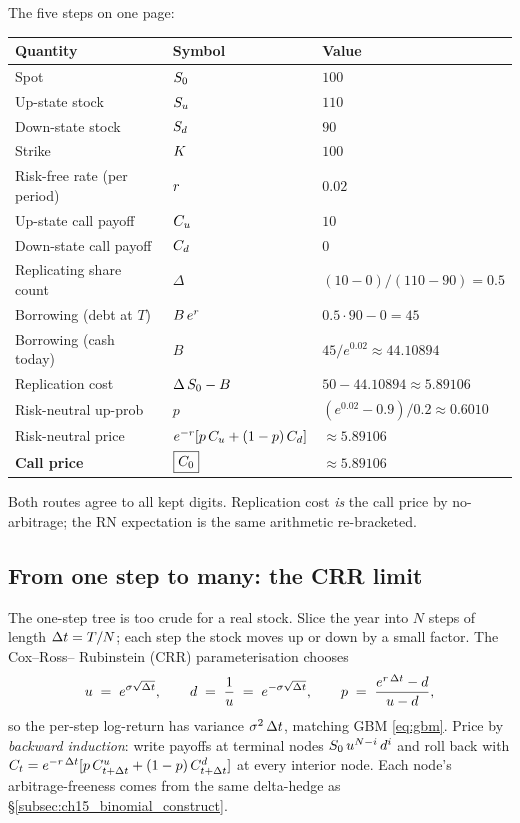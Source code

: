 The five steps on one page:

\begin{center}
\begin{tabular}{@{}lll@{}}
\toprule
\textbf{Quantity} & \textbf{Symbol} & \textbf{Value} \\
\midrule
Spot &  $S_0$           & $100$ \\
Up-state stock & $S_u$  & $110$ \\
Down-state stock & $S_d$ & $90$ \\
Strike & $K$        & $100$ \\
Risk-free rate (per period) & $r$ & $0.02$ \\
Up-state call payoff & $C_u$ & $10$ \\
Down-state call payoff & $C_d$ & $0$ \\
\midrule
Replicating share count & $\Delta$ & $(10-0)/(110-90) = 0.5$ \\
Borrowing (debt at $T$) & $B\,e^{r}$ & $0.5 \cdot 90 - 0 = 45$ \\
Borrowing (cash today) & $B$ & $45 / e^{0.02} \approx 44.10894$ \\
\midrule
Replication cost & $\Delta\,S_0 - B$ & $50 - 44.10894 \approx 5.89106$ \\
Risk-neutral up-prob & $p$ & $(e^{0.02} - 0.9)/0.2 \approx 0.6010$ \\
Risk-neutral price & $e^{-r}[p\,C_u + (1-p)\,C_d]$ & $\approx 5.89106$ \\
\midrule
\textbf{Call price} & $\boxed{C_0}$ & $\boxed{\approx 5.89106}$ \\
\bottomrule
\end{tabular}
\end{center}

Both routes agree to all kept digits. Replication cost
\emph{is} the call price by no-arbitrage; the RN expectation is
the same arithmetic re-bracketed.

\subsection{From one step to many: the CRR limit}
\label{subsec:ch15_crr_limit}

The one-step tree is too crude for a real stock. Slice the year
into $N$ steps of length $\Delta t = T/N$; each step the
stock moves up or down by a small factor. The Cox--Ross--%
Rubinstein (CRR) parameterisation \citep{coxrossrubinstein1979}
chooses
\begin{equation}
  u \;=\; e^{\sigma\sqrt{\Delta t}},
  \qquad
  d \;=\; \frac{1}{u} \;=\; e^{-\sigma\sqrt{\Delta t}},
  \qquad
  p \;=\; \frac{e^{r\,\Delta t} - d}{u - d},
  \label{eq:crr_params}
\end{equation}
so the per-step log-return has variance $\sigma^2\,\Delta t$,
matching GBM \eqref{eq:gbm}. Price by \emph{backward induction}:
write payoffs at terminal nodes $S_0\,u^{N-i}\,d^i$ and roll
back with $C_t = e^{-r\,\Delta t}[p\,C^u_{t+\Delta t}
+ (1-p)\,C^d_{t+\Delta t}]$ at every interior node. Each
node's arbitrage-freeness comes from the same delta-hedge as
\S\ref{subsec:ch15_binomial_construct}.

